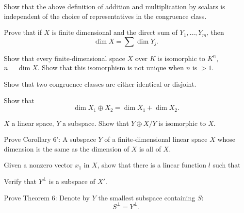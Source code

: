   \begin{exercise}[Lax 1.15] 
    Show that the above definition of addition and multiplication by scalars is independent of the choice of representatives in the congruence class.
  \end{exercise}

  \begin{exercise}[Lax 1.11] 
    Prove that if $X$ is finite dimensional and the direct sum of $Y_1,\ldots,Y_m$, then
    \[ \dim X = \sum \dim Y_j. \]
  \end{exercise}

  \begin{exercise}[Lax 1.12] 
    Show that every finite-dimensional space $X$ over $K$ is isomorphic to $K^n$, $n = \dim X$. Show that this isomorphism is not unique when $n$ is $>1$.
  \end{exercise}

  \begin{exercise}[Lax 1.14] 
    Show that two congruence classes are either identical or disjoint.
  \end{exercise}

  \begin{exercise}[Lax 1.18] 
    Show that
    \[ \dim X_1 \oplus X_2 = \dim X_1 + \dim X_2. \]
  \end{exercise}

  \begin{exercise}[Lax 1.19] 
    $X$ a linear space, $Y$ a subspace. Show that $Y \oplus X/Y$ is isomorphic to $X$.
  \end{exercise}

  \begin{exercise}[Lax 1.17] 
    Prove Corollary 6': A subspace $Y$ of a finite-dimensional linear space $X$ whose dimension is the same as the dimension of $X$ is all of $X$.
  \end{exercise}

  \begin{exercise}[Lax 2.1] 
    Given a nonzero vector $x_1$ in $X$, show that there is a linear function $l$ such that 
  \end{exercise}

  \begin{exercise}[Lax 2.2] 
    Verify that $Y^\perp$ is a subspace of $X'$.
  \end{exercise}

  \begin{exercise}[Lax 2.3] 
    Prove Theorem 6: Denote by $Y$ the smallest subspace containing $S$:
    \[S^\perp = Y^\perp.\]
  \end{exercise}

